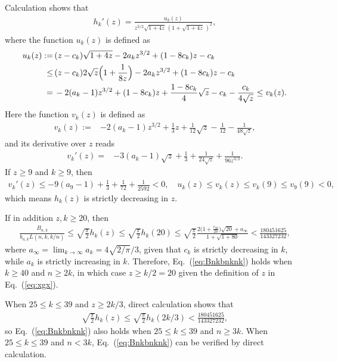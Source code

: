 \documentclass[aop]{imsart}
\theoremstyle{plain}
\theoremstyle{remark}
\newcommand{\1}{\operatorname{\uppercase\expandafter{\romannumeral1}}}
\newcommand{\2}{\operatorname{\uppercase\expandafter{\romannumeral2}}}
\newcommand{\3}{\operatorname{\uppercase\expandafter{\romannumeral3}}}
\newcommand{\4}{\operatorname{\uppercase\expandafter{\romannumeral4}}}
\newcommand{\5}{\operatorname{\uppercase\expandafter{\romannumeral5}}}
\newcommand{\6}{\operatorname{\uppercase\expandafter{\romannumeral6}}}
\newcommand{\7}{\operatorname{\uppercase\expandafter{\romannumeral7}}}
\newcommand{\8}{\operatorname{\uppercase\expandafter{\romannumeral8}}}
\newcommand{\9}{\operatorname{\uppercase\expandafter{\romannumeral9}}}
\newcommand{\eref}[1]{Eq.~\textup{(\ref{#1})}}
\begin{document}
\begin{appendix}
	Calculation shows that
	\begin{align}
	h_k'(z)=\frac{u_k(z)}{z^{3/2}\sqrt{1+4z}\,(1+\sqrt{1+4z}\,)^2},
	\end{align}
	where the function $u_k(z)$ is defined as
	\begin{align}
	u_k(z):=&\,(z-c_k)\sqrt{1+4z}-2a_kz^{3/2}+(1-8c_k)z-c_k\\
	\leq&\, (z-c_k)2\sqrt{z}\Bigl(1+\frac{1}{8z}\Bigr)-2a_kz^{3/2}+(1-8c_k)z-c_k \nonumber	\\
	=&\,-2(a_k-1)z^{3/2}+(1-8c_k)z+\frac{1-8c_k}{4}\sqrt{z}-c_k-\frac{c_k}{4\sqrt{z}}\leq v_k(z). \nonumber
	\end{align}
Here the function $v_k(z)$ is defined as
	\begin{align}
	v_k(z):=&-2(a_k-1)z^{3/2}+\frac{1}{3}z+\frac{1}{12}\sqrt{z}-\frac{1}{12}-\frac{1}{48\sqrt{z}}, 
\end{align}	
and its derivative over $z$ reads	
\begin{align}
	v_k'(z)=&-3(a_k-1)\sqrt{z}+\frac{1}{3}+\frac{1}{24\sqrt{z}}+\frac{1}{96z^{3/2}}.
	\end{align}
If $z\geq 9$ and $k\geq 9$, then 
	\begin{align}
	v_k'(z)\leq -9(a_9-1)+\frac{1}{3}+\frac{1}{72}+\frac{1}{2592}< 0,\quad u_k(z) \leq v_k(z)\leq  v_k(9)\leq  v_9(9)< 0,
	\end{align}
	which means $h_k(z)$ is strictly decreasing in $z$. 
	
	
If in addition $z,k\geq 20$, then 
	\begin{align}
	\frac{B_{n,k}}{ b_{n,k}L(n,k,k/n)}\leq \sqrt{\frac{\pi}{2}}h_k(z)\leq \sqrt{\frac{\pi}{2}} h_k(20)\leq\sqrt{\frac{\pi}{2}}\frac{2\bigl(1+\frac{c_{20}}{20}\bigr)\sqrt{20}+a_\infty}{1+\sqrt{1+80}}< \frac{180451625}{143327232},
	\end{align}
	where $a_\infty=\lim_{k\to \infty}a_k=4\sqrt{2/\pi}/3$, given that $c_k$ is strictly decreasing in $k$, while $a_k$ is strictly increasing in $k$. Therefore, \eref{eq:Bnkbnknk} holds when $k\geq 40$ and $n\geq 2k$, in which case $z\geq k/2=20$ given the definition of $z$ in \eref{eq:xgx}. 
	
	When $25\leq k\leq 39$ and $z\geq 2k/3$, direct calculation shows that 
	\begin{align}
	\sqrt{\frac{\pi}{2}}h_k(z)\leq \sqrt{\frac{\pi}{2}} h_k(2k/3)< \frac{180451625}{143327232},
	\end{align}
	so  \eref{eq:Bnkbnknk} also holds when $25\leq k\leq 39$ and $n\geq 3k$. When $25\leq k\leq 39$ and $n< 3k$,  \eref{eq:Bnkbnknk} can be verified by direct calculation. 
	

\end{appendix}
\end{document}
